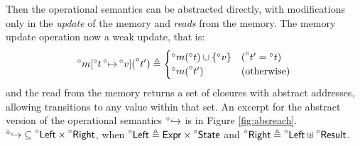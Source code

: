 \documentclass[acmsmall,screen,review]{acmart}\settopmatter{printfolios=true,printccs=false,printacmref=false}
\newcommand*{\A}[1]{\prescript{\circ}{}{#1}}
\newcommand*{\Expr}{\mathsf{Expr}}
\newcommand*{\Left}{\mathsf{Left}}
\newcommand*{\Right}{\mathsf{Right}}
\newcommand*{\mem}{m}
\newcommand*{\State}{\mathsf{State}}
\newcommand*{\Result}{\mathsf{Result}}
\newcommand*{\semarrow}{\hookrightarrow}
\begin{document}
Then the operational semantics can be abstracted directly, with modifications only in the \emph{update} of the memory and \emph{reads} from the memory.
The memory update operation now a weak update, that is:
\[
  \A{\mem}[\A{t}\A{\mapsto}\A{v}](\A{t'})\triangleq
  \begin{cases}
    \A{\mem}(\A{t})\cup\{\A{v}\} & (\A{t'}=\A{t})     \\
    \A{\mem}(\A{t'})             & (\text{otherwise})
  \end{cases}
\]
and the read from the memory returns a set of closures with abstract addresses, allowing transitions to any value within that set.
An excerpt for the abstract version of the operational semantics $\A\semarrow$ is in Figure \ref{fig:absreach}.
$\A\semarrow\subseteq\A\Left\times\A\Right$, when $\A\Left\triangleq\Expr\times\A\State$ and $\A\Right\triangleq\A\Left\uplus\A\Result$.
\end{document}
